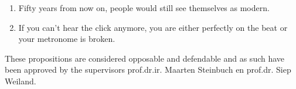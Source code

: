 \documentclass[10pt]{article}%
\newcommand{\mystelling}[1]{%
\item #1
}%
\begin{document}
\begin{enumerate}
\mystelling{Fifty years from now on, people would still see themselves as modern.}

\mystelling{If you can't hear the click anymore, you are either perfectly on the beat or your metronome is broken.}

\end{enumerate}

%
%
%

\vfill \noindent These propositions are considered opposable and defendable and as such have been approved by the supervisors 
prof.dr.ir. Maarten Steinbuch en prof.dr. Siep Weiland.
\newpage

%
%
%
%
%
%
%
%
%
%
%
%
%
%
%
%
%
%
\end{document}
